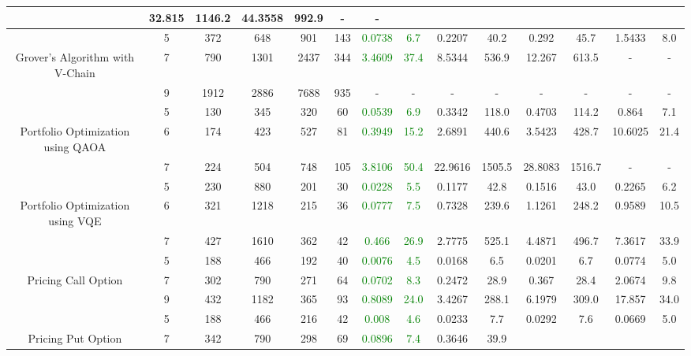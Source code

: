 \begin{table}[htb]
{\begin{tabular}{|c|c|c|c|c|c|c|c|c|c|c|c|c|c|}
 & 32.815 & 1146.2
 & 44.3558 & 992.9
 & - & -
 \\
\hline
 & 
5 & 372 & 648 & 901 & 143
 & \textcolor{green}{0.0738} & \textcolor{green}{6.7}
 & 0.2207 & 40.2
 & 0.292 & 45.7
 & 1.5433 & 8.0
 \\
Grover's Algorithm with V-Chain & 
7 & 790 & 1301 & 2437 & 344
 & \textcolor{green}{3.4609} & \textcolor{green}{37.4}
 & 8.5344 & 536.9
 & 12.267 & 613.5
 & - & -
 \\
 & 
9 & 1912 & 2886 & 7688 & 935
 & - & -
 & - & -
 & - & -
 & - & -
 \\
\hline
 & 
5 & 130 & 345 & 320 & 60
 & \textcolor{green}{0.0539} & \textcolor{green}{6.9}
 & 0.3342 & 118.0
 & 0.4703 & 114.2
 & 0.864 & 7.1
 \\
Portfolio Optimization using QAOA & 
6 & 174 & 423 & 527 & 81
 & \textcolor{green}{0.3949} & \textcolor{green}{15.2}
 & 2.6891 & 440.6
 & 3.5423 & 428.7
 & 10.6025 & 21.4
 \\
 & 
7 & 224 & 504 & 748 & 105
 & \textcolor{green}{3.8106} & \textcolor{green}{50.4}
 & 22.9616 & 1505.5
 & 28.8083 & 1516.7
 & - & -
 \\
\hline
 & 
5 & 230 & 880 & 201 & 30
 & \textcolor{green}{0.0228} & \textcolor{green}{5.5}
 & 0.1177 & 42.8
 & 0.1516 & 43.0
 & 0.2265 & 6.2
 \\
Portfolio Optimization using VQE & 
6 & 321 & 1218 & 215 & 36
 & \textcolor{green}{0.0777} & \textcolor{green}{7.5}
 & 0.7328 & 239.6
 & 1.1261 & 248.2
 & 0.9589 & 10.5
 \\
 & 
7 & 427 & 1610 & 362 & 42
 & \textcolor{green}{0.466} & \textcolor{green}{26.9}
 & 2.7775 & 525.1
 & 4.4871 & 496.7
 & 7.3617 & 33.9
 \\
\hline
 & 
5 & 188 & 466 & 192 & 40
 & \textcolor{green}{0.0076} & \textcolor{green}{4.5}
 & 0.0168 & 6.5
 & 0.0201 & 6.7
 & 0.0774 & 5.0
 \\
Pricing Call Option & 
7 & 302 & 790 & 271 & 64
 & \textcolor{green}{0.0702} & \textcolor{green}{8.3}
 & 0.2472 & 28.9
 & 0.367 & 28.4
 & 2.0674 & 9.8
 \\
 & 
9 & 432 & 1182 & 365 & 93
 & \textcolor{green}{0.8089} & \textcolor{green}{24.0}
 & 3.4267 & 288.1
 & 6.1979 & 309.0
 & 17.857 & 34.0
 \\
\hline
 & 
5 & 188 & 466 & 216 & 42
 & \textcolor{green}{0.008} & \textcolor{green}{4.6}
 & 0.0233 & 7.7
 & 0.0292 & 7.6
 & 0.0669 & 5.0
 \\
Pricing Put Option & 
7 & 342 & 790 & 298 & 69
 & \textcolor{green}{0.0896} & \textcolor{green}{7.4}
 & 0.3646 & 39.9

\end{tabular}}
\end{table}
